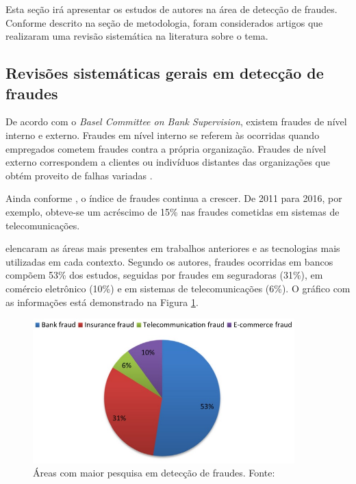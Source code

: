 \documentclass[smallextended]{svjour3}
\begin{document}
Esta seção irá apresentar os estudos de autores na área de detecção de fraudes. Conforme descrito na seção de metodologia, foram considerados artigos que realizaram uma revisão sistemática na literatura sobre o tema.

\subsection{Revisões sistemáticas gerais em detecção de fraudes}

De acordo com o \emph{Basel Committee on Bank Supervision}, existem fraudes de nível interno e externo. Fraudes em nível interno se referem às ocorridas quando empregados cometem fraudes contra a própria organização. Fraudes de nível externo correspondem a clientes ou indivíduos distantes das organizações que obtém proveito de falhas variadas \citep{Abdallah2016}.

Ainda conforme \cite{Abdallah2016}, o índice de fraudes continua a crescer. De 2011 para 2016, por exemplo, obteve-se um acréscimo de 15\% nas fraudes cometidas em sistemas de telecomunicações.

\cite{Abdallah2016} elencaram as áreas mais presentes em trabalhos anteriores e as tecnologias mais utilizadas em cada contexto. Segundo os autores, fraudes ocorridas em bancos compõem 53\% dos estudos, seguidas por fraudes em seguradoras (31\%), em comércio eletrônico (10\%) e em sistemas de telecomunicações (6\%). O gráfico com as informações está demonstrado na Figura \ref{fig:fraudespopulares}. 

\begin{figure}[!ht]
	\centering
	\includegraphics[width=0.9\textwidth]{imagens/fraudespopulares.jpg}
	\caption{Áreas com maior pesquisa em detecção de fraudes. Fonte: \cite{Abdallah2016}}
	\label{fig:fraudespopulares}
\end{figure}
\end{document}

